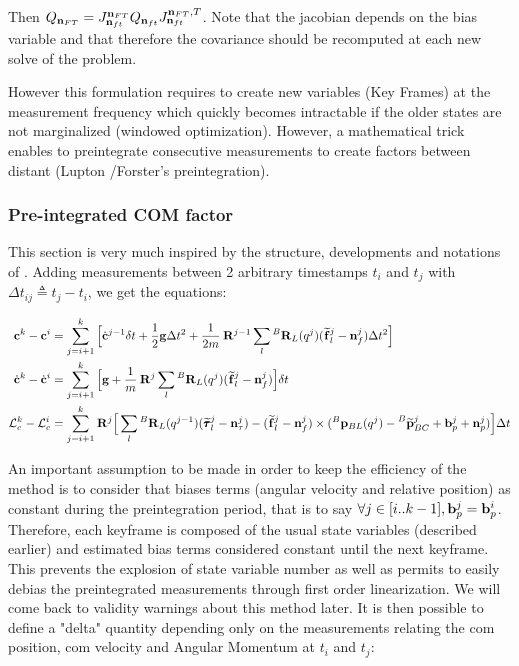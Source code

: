 \documentclass[11pt]{article}
\newcommand{\Rot}[2]{\prescript{#1}{}{\bfR}_{#2}}
\newcommand{\noise}{\bfn}
\newcommand{\bias}{\bfb}
\newcommand{\posi}[2]{\prescript{#1}{}{\bfp}_{#2}}
\newcommand{\posim}[2]{\prescript{#1}{}{\widetilde{\bfp}}_{#2}}
\newcommand{\forcem}[2]{\prescript{#1}{}{\widetilde{\bff}}_{#2}}
\newcommand{\torquem}[2]{\prescript{#1}{}{\widetilde{\pmb{\tau}}}_{#2}}
\newcommand{\AM}{\mathcal{L}}
\newcommand{\COM}{\bfc}
\newcommand{\COMd}{\dot{\bfc}}
\begin{document}
Then $Q_{\noise_{FT}} = J^{\noise_{FT}}_{\noise_{ft}} Q_{\noise_{ft}} J^{\noise_{FT},T}_{\noise_{ft}}$. Note that the jacobian depends on the bias variable and that therefore the covariance should be recomputed at each new solve of the problem.

However this formulation requires to create new variables (Key Frames) at the measurement frequency which quickly becomes intractable if the older states are not marginalized (windowed optimization). However, a mathematical trick enables to preintegrate consecutive measurements to create factors between distant (Lupton \cite{lupton2011visual}/Forster's \cite{forster2016manifold} preintegration).  

\subsubsection{Pre-integrated COM factor}
This section is very much inspired by the structure, developments and notations of \cite{forster2016manifold}.
Adding measurements between 2 arbitrary timestamps \(t_i\) and \(t_j\) with \(\Delta t_{ij} \triangleq t_j - t_i\), we get the equations:

\begin{equation}
\begin{split}
\COM^{k} - \COM^{i} &= \sum_{j=i+1}^{k} \Big[ 
\COMd^{j-1} \delta t 
+ \frac{1}{2}\bfg \Delta t^2 + \frac{1}{2m} \Rot{}{}^{j-1} \sum_l \Rot{B}{L}(q^{j}) (\forcem{}{l}^{j} - \noise_f^{j})\Delta t^2 \Big]
\\
\COMd^{k} - \COMd^{i} &= \sum_{j=i+1}^{k} \Big[ 
\bfg + \frac{1}{m} \Rot{}{}^{j} \sum_l \Rot{B}{L}(q^{j}) (\forcem{}{l}^{j} - \noise_f^{j}) \Big] \delta t 
\\
\AM_c^{k} - \AM_c^{i} &=  \sum_{j=i+1}^{k} \Rot{}{}^{j} \Big[ 
\sum_l \Rot{B}{L}(q^{j-1}) (\torquem{}{l}^{j} - \noise_{\tau}^{j}) - (\forcem{}{l}^{j} - \noise_f^{j}) \times (\posi{B}{BL}(q^j) - \posim{B}{BC}^j + \bias_{p}^j + \noise_p^j) \Big]  \Delta t
\end{split}
\label{eq:COMij}
\end{equation}

An important assumption to be made in order to keep the efficiency of the method is to consider that biases terms (angular velocity and relative position) as constant during the preintegration period, that is to say $\forall j \in [i..k-1], \bias_p^j = \bias_p^i $. Therefore, each keyframe is composed of the usual state variables (described earlier) and estimated bias terms considered constant until the next keyframe. This prevents the explosion of state variable number as well as permits to easily debias the preintegrated measurements through first order linearization. We will come back to validity warnings about this method later.
It is then possible to define a "delta" quantity depending only on the measurements relating the com position, com velocity and Angular Momentum at \(t_i\) and \(t_j\):
\end{document}
